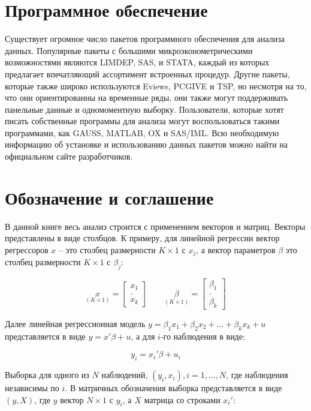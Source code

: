 \section{Программное обеспечение}

Существует огромное число пакетов программного обеспечения для анализа данных. Популярные пакеты с большими микроэконометрическими возможностями являются LIMDEP, SAS, и STATA, каждый из которых предлагает впечатляющий ассортимент встроенных процедур. Другие пакеты, которые также широко используются Eviews, PCGIVE и TSP, но несмотря на то, что они ориентированны на временные ряды, они также могут поддерживать панельные данные и одномоментную выборку. Пользователи, которые хотят писать собственные программы для анализа могут воспользоваться такими программами, как GAUSS, MATLAB, OX и SAS/IML. Всю необходимую информацию об установке и использованию данных пакетов можно найти на официальном сайте разработчиков.

\section{Обозначение и соглашение}

В данной книге весь анализ строится с применением векторов и матриц.
Векторы представлены в виде столбцов. К примеру, для линейной регрессии вектор регрессоров $ x $ -- это столбец размерности $ K \times 1 $ с $ x_{j} $, а вектор параметров $\beta$ это столбец размерности $ K \times 1 $ с $ \beta_{j} $:

\[
\underset{(K\times1)}{x} = \begin{bmatrix} x_{1} \\.\\ x_{k} \end{bmatrix} \qquad 
\underset{(K\times1)}{\beta} = \begin{bmatrix} \beta_{1} \\.\\ \beta_{k} \end{bmatrix}
\]
	
Далее линейная регрессионная модель $y=\beta_{1}x_{1}+\beta_{2}x_{2}+...+\beta_{k}x_{k}+u$ представляется в виде $y=x'\beta+u$, а для $i$-го наблюдения в виде:

\[
y_{i}=x_{i}'\beta+u_{i}
\]

Выборка для одного из $N$ наблюдений, ${(y_{i}, x_{i}), i=1,...,N}$, где наблюдения независимы по $i$.
В матричных обозначения выборка представляется в виде $(y,X)$, где $y$ вектор $ N \times 1 $ с $y_{i}$, а $X$ матрица со строками $x_{i}'$:

